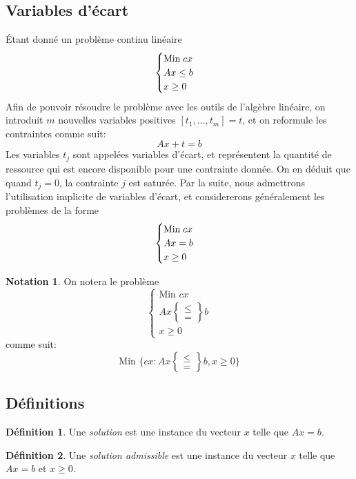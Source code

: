 \documentclass[a4paper]{report}
\theoremstyle{definition}
\newtheorem*{definition}{Définition}
\newtheorem*{notation}{Notation}
\theoremstyle{remark}
\theoremstyle{plain}
\begin{document}
\subsection{Variables d'écart}
Étant donné un problème continu linéaire
\[\begin{cases}
\text{Min\;} cx \\
Ax \le b \\
x \ge 0
\end{cases}\]
Afin de pouvoir résoudre le problème avec les outils de l'algèbre linéaire, on
introduit \(m\) nouvelles variables positives
\([t_1,\dots,t_m]=t\), et on reformule les contraintes comme suit:
\[Ax+t=b\]
Les variables \(t_j\) sont appelées variables d'écart, et représentent la
quantité de ressource qui est encore disponible pour une contrainte donnée.
On en déduit que quand \(t_j=0\), la contrainte \(j\) est saturée.
Par la suite, nous admettrons l'utilisation implicite de variables d'écart,
et considererons généralement les problèmes de la forme
\[\begin{cases}
\text{Min\;} cx \\
Ax = b \\
x \ge 0
\end{cases}\]

\begin{notation}
On notera le problème
\[\begin{cases}
\text{Min } cx \\
Ax \begin{Bmatrix}\le\\=\end{Bmatrix}b \\
x \ge 0
\end{cases}\]
comme suit:
\[\text{Min }\{cx:Ax\begin{Bmatrix}\le\\=\end{Bmatrix}b,x\ge0\}\]
\end{notation}

\subsection{Définitions}
\begin{definition}
Une \emph{solution} est une instance du vecteur \(x\) telle que \(Ax=b\).
\end{definition}

\begin{definition}
Une \emph{solution admissible} est une instance du
vecteur \(x\) telle que \(Ax=b\) et \(x \ge 0\).
\end{definition}
\end{document}

